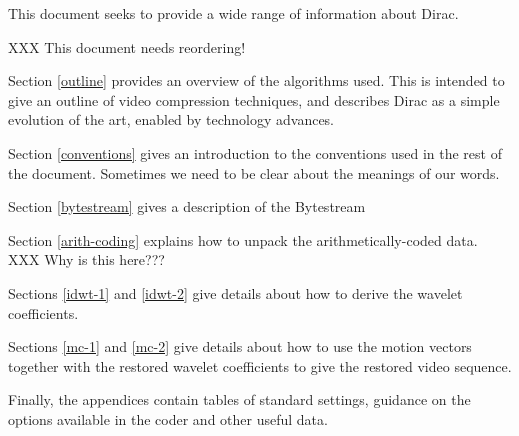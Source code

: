 
This document seeks to provide a wide range of information about Dirac.

XXX This document needs reordering!

Section \ref{outline} provides an overview of the algorithms used. This
is intended to give an outline of video compression techniques, and
describes Dirac as a simple evolution of the art, enabled by technology
advances.

Section \ref{conventions} gives an introduction to the conventions used
in the rest of the document. Sometimes we need to be clear about the
meanings of our words.

Section \ref{bytestream} gives a description of the Bytestream

Section \ref{arith-coding} explains how to unpack the
arithmetically-coded data.
XXX Why is this here???

Sections \ref{idwt-1} and \ref{idwt-2} give details about how to derive
the wavelet coefficients.

Sections \ref{mc-1} and \ref{mc-2} give details about how to use the
motion vectors together with the restored wavelet coefficients to give
the restored video sequence.

Finally, the appendices contain tables of standard settings, guidance on
the options available in the coder and other useful data.

